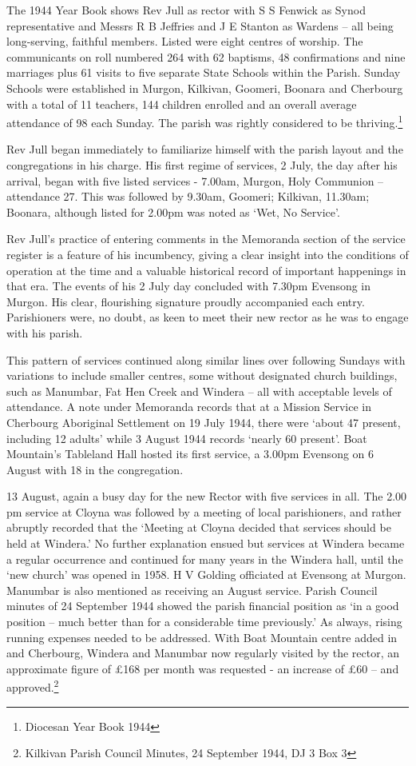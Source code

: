The 1944 Year Book shows Rev Jull as rector with S S Fenwick as Synod
representative and Messrs R B Jeffries and J E Stanton as Wardens -- all
being long-serving, faithful members. Listed were eight centres of
worship. The communicants on roll numbered 264 with 62 baptisms, 48
confirmations and nine marriages plus 61 visits to five separate State
Schools within the Parish. Sunday Schools were established in Murgon,
Kilkivan, Goomeri, Boonara and Cherbourg with a total of 11 teachers,
144 children enrolled and an overall average attendance of 98 each
Sunday. The parish was rightly considered to be thriving.\footnote{Diocesan
  Year Book 1944}

Rev Jull began immediately to familiarize himself with the parish layout
and the congregations in his charge. His first regime of services, 2
July, the day after his arrival, began with five listed services -
7.00am, Murgon, Holy Communion -- attendance 27. This was followed by
9.30am, Goomeri; Kilkivan, 11.30am; Boonara, although listed for 2.00pm
was noted as `Wet, No Service'.

Rev Jull's practice of entering comments in the Memoranda section of the
service register is a feature of his incumbency, giving a clear insight
into the conditions of operation at the time and a valuable historical
record of important happenings in that era. The events of his 2 July day
concluded with 7.30pm Evensong in Murgon. His clear, flourishing
signature proudly accompanied each entry. Parishioners were, no doubt,
as keen to meet their new rector as he was to engage with his parish.

This pattern of services continued along similar lines over following
Sundays with variations to include smaller centres, some without
designated church buildings, such as Manumbar, Fat Hen Creek and Windera
-- all with acceptable levels of attendance. A note under Memoranda
records that at a Mission Service in Cherbourg Aboriginal Settlement on
19 July 1944, there were `about 47 present, including 12 adults' while 3
August 1944 records `nearly 60 present'. Boat Mountain's Tableland Hall
hosted its first service, a 3.00pm Evensong on 6 August with 18 in the
congregation.

13 August, again a busy day for the new Rector with five services in
all. The 2.00 pm service at Cloyna was followed by a meeting of local
parishioners, and rather abruptly recorded that the `Meeting at Cloyna
decided that services should be held at Windera.' No further explanation
ensued but services at Windera became a regular occurrence and continued
for many years in the Windera hall, until the `new church' was opened in
1958. H V Golding officiated at Evensong at Murgon. Manumbar is also
mentioned as receiving an August service. Parish Council minutes of 24
September 1944 showed the parish financial position as `in a good
position -- much better than for a considerable time previously.' As
always, rising running expenses needed to be addressed. With Boat
Mountain centre added in and Cherbourg, Windera and Manumbar now
regularly visited by the rector, an approximate figure of £168 per month
was requested - an increase of £60 -- and approved.\footnote{Kilkivan
  Parish Council Minutes, 24 September 1944, DJ 3 Box 3}

